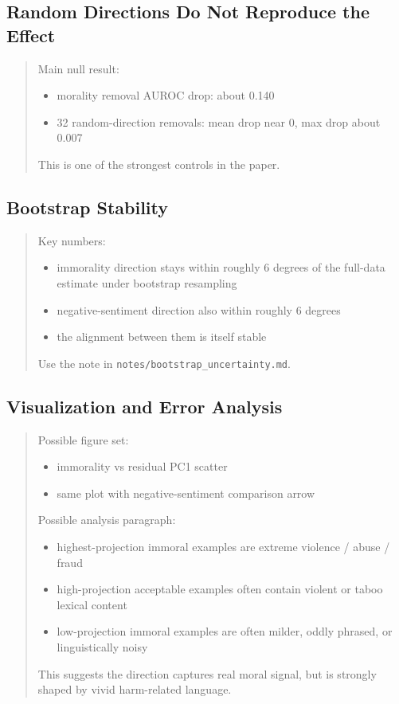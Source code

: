 \documentclass[11pt]{article}
\newcommand{\draftnote}[1]{%
  \begin{quote}\footnotesize\color{gray}#1\end{quote}%
}
\begin{document}
\subsection{Random Directions Do Not Reproduce the Effect}
\draftnote{
Main null result:
\begin{itemize}[leftmargin=1.5em]
    \item morality removal AUROC drop: about 0.140
    \item 32 random-direction removals: mean drop near 0, max drop about 0.007
\end{itemize}
This is one of the strongest controls in the paper.
}

\subsection{Bootstrap Stability}
\draftnote{
Key numbers:
\begin{itemize}[leftmargin=1.5em]
    \item immorality direction stays within roughly 6 degrees of the full-data estimate under bootstrap resampling
    \item negative-sentiment direction also within roughly 6 degrees
    \item the alignment between them is itself stable
\end{itemize}
Use the note in \texttt{notes/bootstrap\_uncertainty.md}.
}

\subsection{Visualization and Error Analysis}
\draftnote{
Possible figure set:
\begin{itemize}[leftmargin=1.5em]
    \item immorality vs residual PC1 scatter
    \item same plot with negative-sentiment comparison arrow
\end{itemize}
Possible analysis paragraph:
\begin{itemize}[leftmargin=1.5em]
    \item highest-projection immoral examples are extreme violence / abuse / fraud
    \item high-projection acceptable examples often contain violent or taboo lexical content
    \item low-projection immoral examples are often milder, oddly phrased, or linguistically noisy
\end{itemize}
This suggests the direction captures real moral signal, but is strongly shaped by vivid harm-related language.
}
\end{document}

